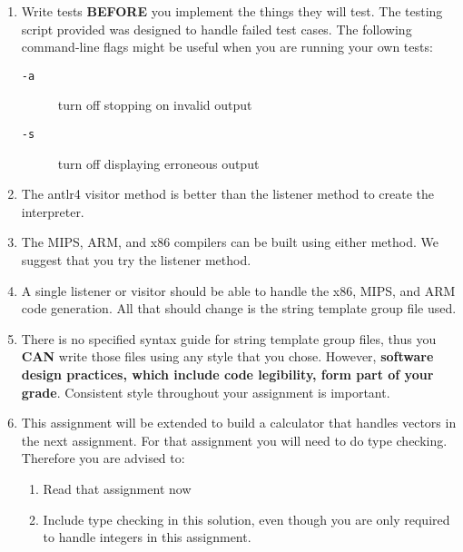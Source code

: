 \documentclass{article}
\begin{document}
	\begin{enumerate}
		\item Write tests \textbf{BEFORE} you implement the things they will test. The testing script provided was
		designed to handle failed test cases.  The following command-line flags might be useful when you are running your own tests:
		\begin{description}
			\item[{\tt -a}] turn off stopping on invalid output
			\item[{\tt -s}]  turn off displaying erroneous output
		\end{description}
		\item The antlr4 visitor method is better than the listener method to create the interpreter.
		\item The MIPS, ARM, and x86 compilers can be built using either method. We suggest that you try the listener method.
		\item A single listener or visitor should be able to handle the x86, MIPS, and ARM code generation. All that should
		change is the string template group file used.
		\item There is no specified syntax guide for string template group files, thus you \textbf{CAN} write those files using
		any style that you chose. However, \textbf{software design practices, which include code legibility, form part of your grade}.
		Consistent style throughout your assignment is important.
		\item This assignment will be extended to build a calculator that handles vectors in the next assignment. For that assignment
		you will need to do type checking. Therefore you are advised to:
		\begin {enumerate}
			\item Read that assignment now
			\item Include type checking in this solution, even though you are only
			required to handle integers in this assignment.
		\end {enumerate}
	\end{enumerate}
\end{document}
